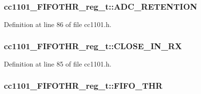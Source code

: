 \subsubsection[{\texorpdfstring{A\+D\+C\+\_\+\+R\+E\+T\+E\+N\+T\+I\+ON}{ADC_RETENTION}}]{ cc1101\+\_\+\+F\+I\+F\+O\+T\+H\+R\+\_\+reg\+\_\+t\+::\+A\+D\+C\+\_\+\+R\+E\+T\+E\+N\+T\+I\+ON}\hypertarget{structcc1101___f_i_f_o_t_h_r__reg__t_aa9fa5993faaf2d645fb404c2dfe5f948}{}\label{structcc1101___f_i_f_o_t_h_r__reg__t_aa9fa5993faaf2d645fb404c2dfe5f948}


Definition at line 86 of file cc1101.\+h.

\subsubsection[{\texorpdfstring{C\+L\+O\+S\+E\+\_\+\+I\+N\+\_\+\+RX}{CLOSE_IN_RX}}]{ cc1101\+\_\+\+F\+I\+F\+O\+T\+H\+R\+\_\+reg\+\_\+t\+::\+C\+L\+O\+S\+E\+\_\+\+I\+N\+\_\+\+RX}\hypertarget{structcc1101___f_i_f_o_t_h_r__reg__t_a04e7c193e07ec532af3d9899dad352db}{}\label{structcc1101___f_i_f_o_t_h_r__reg__t_a04e7c193e07ec532af3d9899dad352db}


Definition at line 85 of file cc1101.\+h.

\subsubsection[{\texorpdfstring{F\+I\+F\+O\+\_\+\+T\+HR}{FIFO_THR}}]{ cc1101\+\_\+\+F\+I\+F\+O\+T\+H\+R\+\_\+reg\+\_\+t\+::\+F\+I\+F\+O\+\_\+\+T\+HR}\hypertarget{structcc1101___f_i_f_o_t_h_r__reg__t_ac2736149dd3869020df9f5b281c3d2e8}{}\label{structcc1101___f_i_f_o_t_h_r__reg__t_ac2736149dd3869020df9f5b281c3d2e8}


